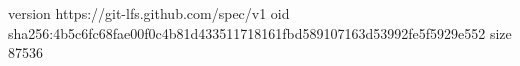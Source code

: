 version https://git-lfs.github.com/spec/v1
oid sha256:4b5c6fc68fae00f0c4b81d433511718161fbd589107163d53992fe5f5929e552
size 87536
